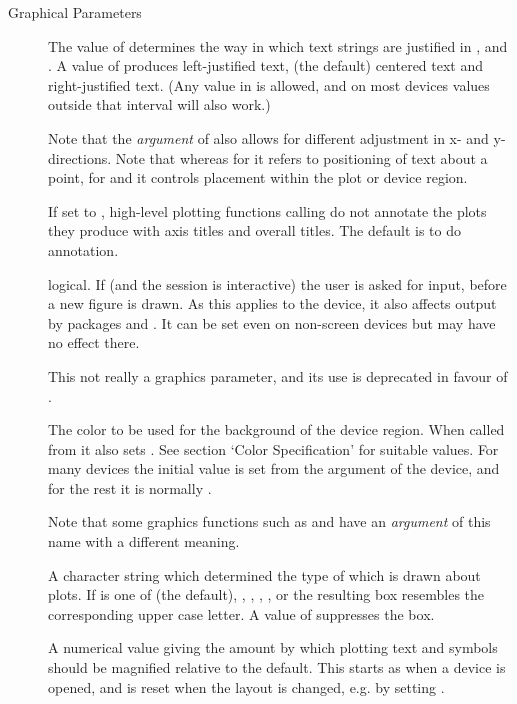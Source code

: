 \begin{Section}{Graphical Parameters}
\begin{description}

\item[] The value of  determines the way in
which text strings are justified in ,
 and .  A value of  produces
left-justified text,  (the default) centered text and 
right-justified text.  (Any value in \eqn{[0, 1]}{} is allowed, and
on most devices values outside that interval will also work.)

Note that the  \emph{argument} of  also
allows  for different adjustment in x- and y-
directions.  Note that whereas for  it refers to
positioning of text about a point, for  and
 it controls placement within the plot or device region.
\item[] If set to , high-level plotting
functions calling  do not annotate the
plots they produce with axis titles and overall titles.  The
default is to do annotation.
\item[] logical.  If  (and the \R{} session is
interactive) the user is asked for input, before a new figure is
drawn.  As this applies to the device, it also affects output by
packages  and .  It can be set even on
non-screen devices but may have no effect there.

This not really a graphics parameter, and its use is deprecated in
favour of .

\item[] The color to be used for the background of the
device region.  When called from  it also sets
. See section `Color Specification' for
suitable values.  For many devices the initial value is set from
the  argument of the device, and for the rest it is
normally .

Note that some graphics functions such as
 and  have an
\emph{argument} of this name with a different meaning.
\item[] A character string which determined the type of
 which is drawn about plots.  If  is
one of  (the default), , ,
, , or \code{"]"} the resulting box resembles
the corresponding upper case letter.  A value of 
suppresses the box.
\item[] A numerical value giving the amount by which
plotting text and symbols should be magnified relative to the
default.  This starts as  when a device is opened, and is
reset when the layout is changed, e.g. by setting .


\end{description}
\end{Section}
